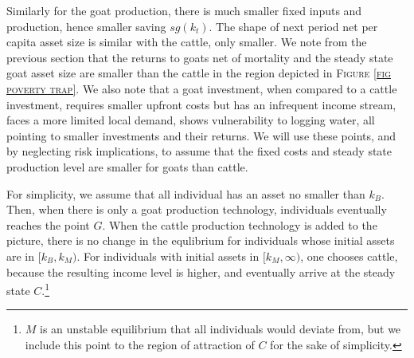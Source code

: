 	Similarly for the goat production, there is much smaller fixed inputs and production, hence smaller saving $sg(k_{t})$. The shape of next period net per capita asset size is similar with the cattle, only smaller. We note from the previous section that the returns to goats net of mortality and the steady state goat asset size are smaller than the cattle in the region depicted in \textsc{\small Figure \ref{fig poverty trap}}. We also note that a goat investment, when compared to a cattle investment, requires smaller upfront costs but has an infrequent income stream, faces a more limited local demand, shows vulnerability to logging water, all pointing to smaller investments and their returns. We will use these points, and by neglecting risk implications, to assume that the fixed costs and steady state production level are smaller for goats than cattle.  

	For simplicity, we assume that all individual has an asset no smaller than $k_{B}$. Then, when there is only a goat production technology, individuals eventually reaches the point $G$. When the cattle production technology is added to the picture, there is no change in the equlibrium for individuals whose initial assets are in $[k_{B}, k_{M})$. For individuals with initial assets in $[k_{M}, \infty)$, one chooses cattle, because the resulting income level is higher, and eventually arrive at the steady state $C$.\footnote{$M$ is an unstable equilibrium that all individuals would deviate from, but we include this point to the region of attraction of $C$ for the sake of simplicity. } 

